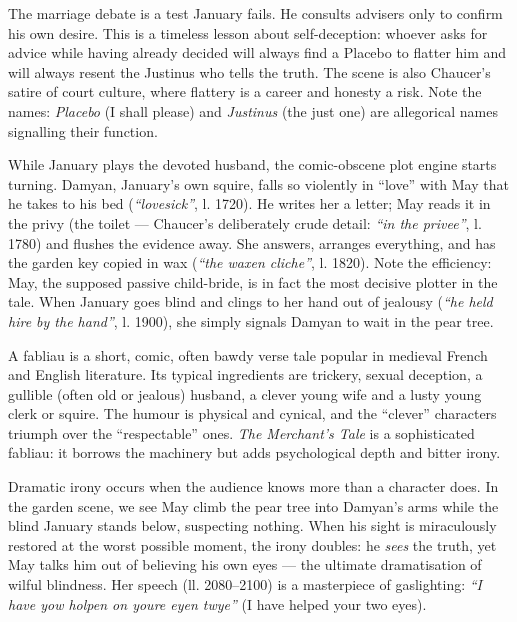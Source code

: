 \documentclass[11pt]{article}
\newcommand{\cle}[1]{{\popxbold\color{popdark}#1}}
\newcounter{popsec}
\newcounter{popsub}
\newcommand{\courssub}[1]{%
  \stepcounter{popsub}%
  \par\vspace{9pt}\noindent{\popxbold\fontsize{11.5}{13}\selectfont\color{popink}{\color{poporange}\thepopsec.\thepopsub}\hspace{6pt}#1}\par\nopagebreak\vspace{4pt}
}
\begin{document}
\begin{aretenir}
The marriage debate is a test January fails. He consults advisers only to confirm his own desire. This is a timeless lesson about \cle{self-deception}: whoever asks for advice while having already decided will always find a Placebo to flatter him and will always resent the Justinus who tells the truth. The scene is also Chaucer's satire of court culture, where flattery is a career and honesty a risk. Note the names: \emph{Placebo} (I shall please) and \emph{Justinus} (the just one) are \cle{allegorical names} signalling their function.
\end{aretenir}

\courssub{Damyan and May: The Fabliau Machinery}

While January plays the devoted husband, the comic-obscene plot engine starts turning. Damyan, January's own squire, falls so violently in ``love'' with May that he takes to his bed (\emph{``lovesick''}, l. 1720). He writes her a letter; May reads it in the \cle{privy} (the toilet --- Chaucer's deliberately crude detail: \emph{``in the privee''}, l. 1780) and flushes the evidence away. She answers, arranges everything, and has the garden key copied in wax (\emph{``the waxen cliche''}, l. 1820). Note the efficiency: May, the supposed passive child-bride, is in fact the most decisive plotter in the tale. When January goes blind and clings to her hand out of jealousy (\emph{``he held hire by the hand''}, l. 1900), she simply signals Damyan to wait in the pear tree.

\begin{definition}[Fabliau]
A \cle{fabliau} is a short, comic, often bawdy verse tale popular in medieval French and English literature. Its typical ingredients are trickery, sexual deception, a gullible (often old or jealous) husband, a clever young wife and a lusty young clerk or squire. The humour is physical and cynical, and the ``clever'' characters triumph over the ``respectable'' ones. \emph{The Merchant's Tale} is a sophisticated fabliau: it borrows the machinery but adds psychological depth and bitter irony.
\end{definition}

\begin{definition}
\cle{Dramatic irony} occurs when the audience knows more than a character does. In the garden scene, we see May climb the pear tree into Damyan's arms while the blind January stands below, suspecting nothing. When his sight is miraculously restored at the worst possible moment, the irony doubles: he \emph{sees} the truth, yet May talks him out of believing his own eyes --- the ultimate dramatisation of wilful blindness. Her speech (ll. 2080--2100) is a masterpiece of gaslighting: \emph{``I have yow holpen on youre eyen twye''} (I have helped your two eyes).
\end{definition}
\end{document}
